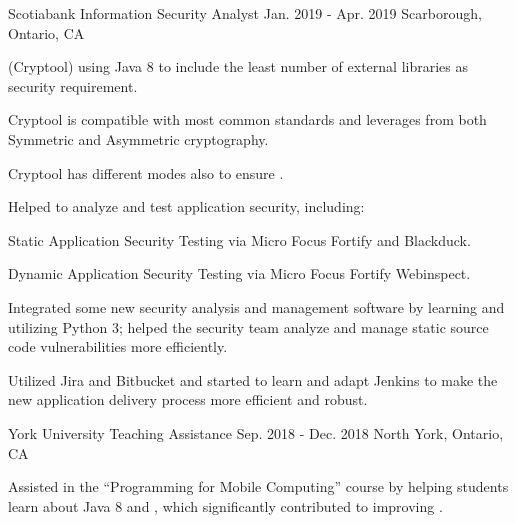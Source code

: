 \begin{cventries}
  \cventry
    {Scotiabank} %
    {Information Security Analyst} %
    {Jan. 2019 - Apr. 2019} %
    {Scarborough, Ontario, CA} %
    {
      \begin{cvitems} %
        \item { (Cryptool) using Java 8  to include the least number of external libraries as security requirement.}
          \begin{cvsubitems}
            \item {Cryptool is compatible with most common  standards and leverages from both Symmetric and Asymmetric cryptography.}
            \item {Cryptool has different modes also to ensure .}
          \end{cvsubitems}
        \item {Helped to analyze and test application security, including:}
          \begin{cvsubitems}
            \item {Static Application Security Testing via Micro Focus Fortify and Blackduck.}
            \item {Dynamic Application Security Testing via Micro Focus Fortify Webinspect.}
          \end{cvsubitems}
        \item {Integrated some new security analysis and management software by learning and utilizing Python 3; helped the security team analyze and manage static source code vulnerabilities more efficiently.}
          \begin{cvsubitems}
            \item {Utilized Jira and Bitbucket and started to learn and adapt Jenkins to make the new application delivery process more efficient and robust.}
          \end{cvsubitems}
      \end{cvitems}
    }

  \cventry
    {York University} %
    {Teaching Assistance} %
    {Sep. 2018 - Dec. 2018} %
    {North York, Ontario, CA} %
    {
      \begin{cvitems} %
        \item {Assisted in the “Programming for Mobile Computing” course by helping students learn about Java 8 and , which significantly contributed to improving .}
      \end{cvitems}
    }


\end{cventries}
